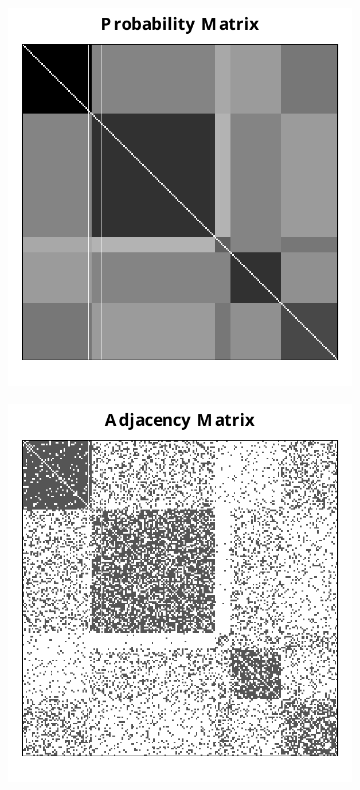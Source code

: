 \documentclass[10pt,letterpaper]{article}
\begin{document}
\begin{figure}
\centering
\begin{subfigure}{.4\textwidth}
  \centering
  \includegraphics[width=\linewidth]{SBM_P.pdf}
\end{subfigure}%
\begin{subfigure}{.4\textwidth}
  \centering
  \includegraphics[width=\linewidth]{SBM_A.pdf}

\end{subfigure}
\end{figure}
\end{document}
